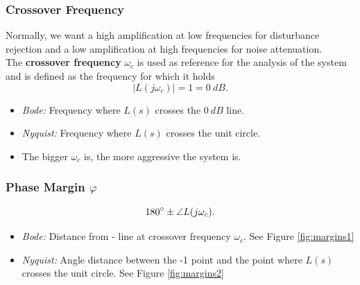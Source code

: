 \documentclass[a4paper,12 pt]{article}
\numberwithin{equation}{section}
\theoremstyle{definition}
\theoremstyle{remark}
\theoremstyle{definition}
\theoremstyle{definition}
\theoremstyle{definition}
\theoremstyle{remark}
\begin{document}
\subsubsection{Crossover Frequency}
Normally, we want a high amplification at low frequencies for disturbance rejection and a low amplification at high frequencies for noise attenuation. \\
The \textbf{crossover frequency} $\omega_c$ is used as reference for the analysis of the system and is defined as the frequency for which it holds
\begin{equation}
|L(j\omega_c)|=1=0 \ dB.
\end{equation}

\begin{itemize}

\item \textit{Bode:} Frequency where $L(s)$ crosses the $0 \ dB$ line.
\item \textit{Nyquist:} Frequency where $L(s)$ crosses the unit circle.
\item The bigger $\omega_c$ is, the more aggressive the system is.

\end{itemize}

\subsubsection{Phase Margin $\varphi$}
\begin{equation}
\text{180}\degree \pm \angle L(j\omega_c).
\end{equation}
\begin{itemize}
\item \textit{Bode:} Distance from - \degree line at crossover frequency $\omega_c$. See Figure \ref{fig:margins1}

\item \textit{Nyquist:} Angle distance between the -1 point and the point where $L(s)$ crosses the unit circle. See Figure \ref{fig:margins2}

\end{itemize}
\end{document}
